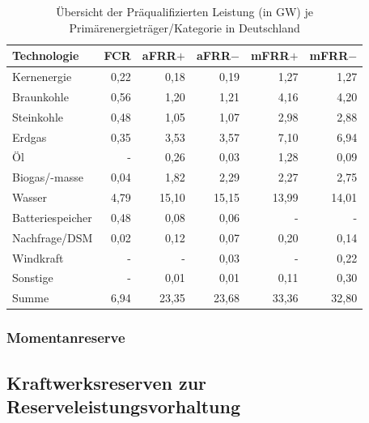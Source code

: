 			\begin{table}[H]
				\renewcommand*{\arraystretch}{1.3} %
				\centering
				\caption{Übersicht der Präqualifizierten Leistung (in \si{\giga\watt}) je Primärenergieträger/Kategorie in Deutschland}
				\label{Tab. Übersicht der Präqualifizierten Leistung je PrimärenergieträgerKategorie in Deutschland}
				\begin{tabular}{lrrrrr}
					\hline
					Technologie & FCR  & aFRR$+$ & aFRR$-$& mFRR$+$ & mFRR$-$ \\ \hline
					Kernenergie & 0,22 & 0,18 & 0,19 & 1,27 & 1,27 \\
					Braunkohle & 0,56 & 1,20 & 1,21 & 4,16 & 4,20 \\
					Steinkohle & 0,48 & 1,05 & 1,07 & 2,98 & 2,88 \\
					Erdgas & 0,35 & 3,53 & 3,57 & 7,10 & 6,94 \\
					Öl & - & 0,26 & 0,03 & 1,28 & 0,09 \\
					Biogas/-masse & 0,04 & 1,82 & 2,29 & 2,27 & 2,75 \\
					Wasser & 4,79 & 15,10 & 15,15 & 13,99 & 14,01 \\
					Batteriespeicher & 0,48 & 0,08 & 0,06 & - & - \\
					Nachfrage/DSM & 0,02 & 0,12 & 0,07 & 0,20 & 0,14 \\
					Windkraft & - & - & 0,03 & - & 0,22 \\
					Sonstige & - & 0,01 & 0,01 & 0,11 & 0,30 \\ \hline
					Summe & 6,94 & 23,35 & 23,68 & 33,36 & 32,80
				\end{tabular}
				\renewcommand*{\arraystretch}{1.5} %
			\end{table}
			
			
		\subsubsection{Momentanreserve}
		
		
		
	
	\subsection{Kraftwerksreserven zur Reserveleistungsvorhaltung}